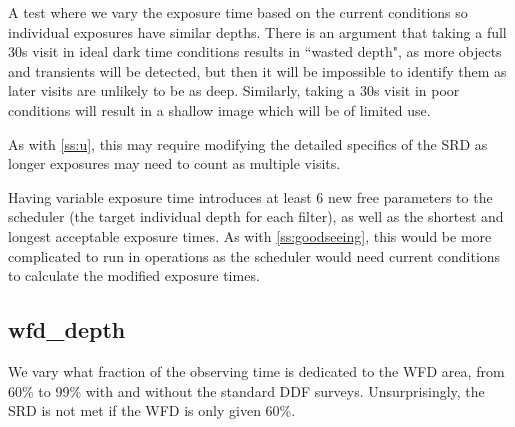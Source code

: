 A test where we vary the exposure time based on the current conditions so individual exposures have similar depths. There is an argument that taking a full 30s visit in ideal dark time conditions results in ``wasted depth", as more objects and transients will be detected, but then it will be impossible to identify them as later visits are unlikely to be as deep. Similarly, taking a 30s visit in poor conditions will result in a shallow image which will be of limited use.

As with \ref{ss:u}, this may require modifying the detailed specifics of the SRD as longer exposures may need to count as multiple visits.

Having variable exposure time introduces at least 6 new free parameters to the scheduler (the target individual depth for each filter), as well as the shortest and longest acceptable exposure times.  As with \ref{ss:goodseeing}, this would be more complicated to run in operations as the scheduler would need current conditions to calculate the modified exposure times.

\subsection{wfd\_depth}

We vary what fraction of the observing time is dedicated to the WFD area, from 60\% to 99\% with and without the standard DDF surveys. Unsurprisingly, the SRD is not met if the WFD is only given 60\%.














